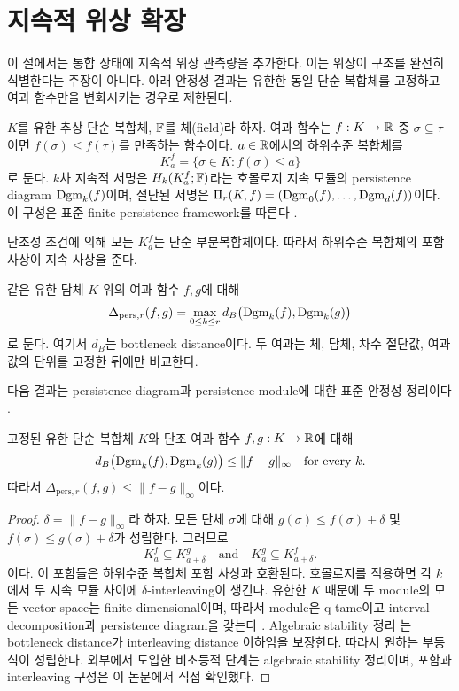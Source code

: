 \section{지속적 위상 확장}

이 절에서는 통합 상태에 지속적 위상 관측량을 추가한다. 이는 위상이
구조를 완전히 식별한다는 주장이 아니다. 아래 안정성 결과는 유한한
동일 단순 복합체를 고정하고 여과 함수만을 변화시키는 경우로 제한된다.

\begin{definition}[여과된 유한 담체]
$K$를 유한 추상 단순 복합체, $\mathbb{F}$를 체(field)라 하자. 여과 함수는
$f:K\to\mathbb{R}$ 중 $\sigma\subseteq\tau$이면
$f(\sigma)\leq f(\tau)$를 만족하는 함수이다. $a\in\mathbb{R}$에서의
하위수준 복합체를
\[
 K_a^f=\{\sigma\in K:f(\sigma)\leq a\}
\]
로 둔다. $k$차 지속적 서명은 $H_k(K_a^f;\mathbb{F})$라는 호몰로지 지속 모듈의
persistence diagram $\operatorname{Dgm}_k(f)$이며, 절단된 서명은
$\Pi_r(K,f)=(\operatorname{Dgm}_0(f),\ldots,\operatorname{Dgm}_d(f))$이다. 이 구성은 표준 finite
persistence framework를 따른다
\cite{edelsbrunner2002topological,zomorodian2005computing}.
\end{definition}

단조성 조건에 의해 모든 $K_a^f$는 단순 부분복합체이다. 따라서 하위수준
복합체의 포함 사상이 지속 사상을 준다.

\begin{definition}
같은 유한 담체 $K$ 위의 여과 함수 $f,g$에 대해
\[
 \Delta_{\mathrm{pers},r}(f,g)=\max_{0\leq k\leq r}
 d_B\bigl(\operatorname{Dgm}_k(f),\operatorname{Dgm}_k(g)\bigr)
\]
로 둔다. 여기서 $d_B$는 bottleneck distance이다. 두 여과는 체, 담체,
차수 절단값, 여과값의 단위를 고정한 뒤에만 비교한다.
\end{definition}

다음 결과는 persistence diagram과 persistence module에 대한 표준 안정성
정리이다 \cite{cohensteiner2007stability,chazal2009proximity}.

\begin{theorem}
고정된 유한 단순 복합체 $K$와 단조 여과 함수 $f,g:K\to\mathbb{R}$에 대해
\[
 d_B\bigl(\operatorname{Dgm}_k(f),\operatorname{Dgm}_k(g)\bigr)\leq \|f-g\|_\infty
 \quad\text{for every }k.
\]
따라서 $\Delta_{\mathrm{pers},r}(f,g)\leq\|f-g\|_\infty$이다.
\end{theorem}

\begin{proof}
$\delta=\|f-g\|_\infty$라 하자. 모든 단체 $\sigma$에 대해
$g(\sigma)\leq f(\sigma)+\delta$ 및
$f(\sigma)\leq g(\sigma)+\delta$가 성립한다. 그러므로
\[
 K_a^f\subseteq K_{a+\delta}^g
 \quad\text{and}\quad
 K_a^g\subseteq K_{a+\delta}^f.
\]
이다. 이 포함들은 하위수준 복합체 포함 사상과 호환된다. 호몰로지를
적용하면 각 $k$에서 두 지속 모듈 사이에 $\delta$-interleaving이 생긴다.
유한한 $K$ 때문에 두 module의 모든 vector space는 finite-dimensional이며,
따라서 module은 q-tame이고 interval decomposition과 persistence diagram을
갖는다 \cite{crawleyboevey2015decomposition}. Algebraic
stability 정리 \cite{chazal2009proximity,bauerlesnick2015induced}는 bottleneck distance가
interleaving distance 이하임을 보장한다. 따라서 원하는 부등식이 성립한다. 외부에서 도입한
비초등적 단계는 algebraic stability 정리이며, 포함과 interleaving 구성은
이 논문에서 직접 확인했다.
\end{proof}

